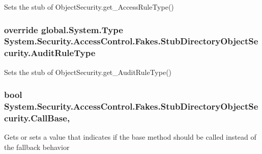 Sets the stub of Object\-Security.\-get\-\_\-\-Access\-Rule\-Type()

\hypertarget{class_system_1_1_security_1_1_access_control_1_1_fakes_1_1_stub_directory_object_security_a220234da3acf20f21e1e19fd73f15191}{
\subsubsection[{Audit\-Rule\-Type}]{\setlength{\rightskip}{0pt plus 5cm}override global.\-System.\-Type System.\-Security.\-Access\-Control.\-Fakes.\-Stub\-Directory\-Object\-Security.\-Audit\-Rule\-Type\hspace{0.3cm}{\ttfamily [get]}}}\label{class_system_1_1_security_1_1_access_control_1_1_fakes_1_1_stub_directory_object_security_a220234da3acf20f21e1e19fd73f15191}


Sets the stub of Object\-Security.\-get\-\_\-\-Audit\-Rule\-Type()

\hypertarget{class_system_1_1_security_1_1_access_control_1_1_fakes_1_1_stub_directory_object_security_a69bf6993cb88dca64a0b37e8b7a9d8a9}{
\subsubsection[{Call\-Base}]{\setlength{\rightskip}{0pt plus 5cm}bool System.\-Security.\-Access\-Control.\-Fakes.\-Stub\-Directory\-Object\-Security.\-Call\-Base\hspace{0.3cm}{\ttfamily [get]}, {\ttfamily [set]}}}\label{class_system_1_1_security_1_1_access_control_1_1_fakes_1_1_stub_directory_object_security_a69bf6993cb88dca64a0b37e8b7a9d8a9}


Gets or sets a value that indicates if the base method should be called instead of the fallback behavior

